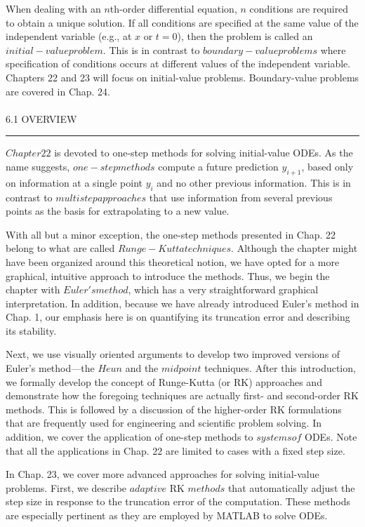 \documentclass[../main.tex]{subfiles}
\begin{document}
When dealing with an $n$th-order differential equation, $n$ conditions are required to obtain a unique solution. If all conditions are specified at the same value of the independent
variable (e.g., at $x$ or $t = 0$), then the problem is called an $initial-value problem$. This is in
contrast to $boundary-value problems$ where specification of conditions occurs at different
values of the independent variable. Chapters 22 and 23 will focus on initial-value problems. Boundary-value problems are covered in Chap. 24.\\
\vspace{0,2 cm}\\
\Large{6.1 \; OVERVIEW}\\
\hrule
\vspace{0,5 cm}
$Chapter 22$ is devoted to one-step methods for solving initial-value ODEs. As the name
suggests, $one-step methods$ compute a future prediction $y_{i+1}$, based only on information at
a single point $y_{i}$ and no other previous information. This is in contrast to $multistep approaches$ that use information from several previous points as the basis for extrapolating to
a new value.

With all but a minor exception, the one-step methods presented in Chap. 22 belong to
what are called $Runge-Kutta techniques$. Although the chapter might have been organized
around this theoretical notion, we have opted for a more graphical, intuitive approach to introduce the methods. Thus, we begin the chapter with $Euler's method$, which has a very
straightforward graphical interpretation. In addition, because we have already introduced
Euler's method in Chap. 1, our emphasis here is on quantifying its truncation error and describing its stability. 

Next, we use visually oriented arguments to develop two improved versions of Euler's
method—the $Heun$ and the $midpoint$ techniques. After this introduction, we formally develop the concept of Runge-Kutta (or RK) approaches and demonstrate how the foregoing
techniques are actually first- and second-order RK methods. This is followed by a discussion of the higher-order RK formulations that are frequently used for engineering and
scientific problem solving. In addition, we cover the application of one-step methods to
$systems of$ ODEs. Note that all the applications in Chap. 22 are limited to cases with a fixed
step size.

In Chap. 23, we cover more advanced approaches for solving initial-value problems.
First, we describe $adaptive$ RK $methods$ that automatically adjust the step size in response
to the truncation error of the computation. These methods are especially pertinent as they
are employed by MATLAB to solve ODEs.
\end{document}
